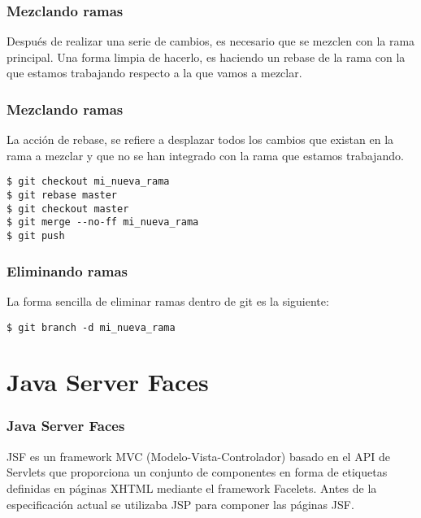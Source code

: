 \documentclass{beamer}
\begin{document}
\begin{frame}[fragile]
  \frametitle{Mezclando ramas}
  Después de realizar una serie de cambios, es necesario que se mezclen con la
rama principal. Una forma limpia de hacerlo, es haciendo un rebase de la rama
con la que estamos trabajando respecto a la que vamos a mezclar.
\end{frame}

\begin{frame}[fragile]
  \frametitle{Mezclando ramas}
  La acción de rebase, se refiere a desplazar todos los cambios que
  existan en la rama a mezclar y que no se han integrado con la rama que
  estamos trabajando.

\begin{verbatim}
$ git checkout mi_nueva_rama
$ git rebase master
$ git checkout master
$ git merge --no-ff mi_nueva_rama
$ git push
\end{verbatim}

\end{frame}

\begin{frame}[fragile]
  \frametitle{Eliminando ramas}
  La forma sencilla de eliminar ramas dentro de git es la siguiente:

\begin{verbatim}
$ git branch -d mi_nueva_rama

\end{verbatim}


\end{frame}

\section{Java Server Faces}

\begin{frame}
  \frametitle{Java Server Faces}
  JSF es un framework MVC (Modelo-Vista-Controlador) basado en el API
  de Servlets que proporciona un conjunto de componentes en forma de
  etiquetas definidas en páginas XHTML mediante el framework Facelets.
  Antes de la especificación actual se utilizaba JSP para componer las
  páginas JSF.
\end{frame}
\end{document}
